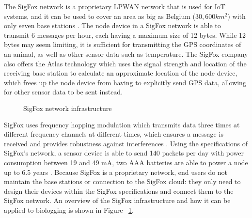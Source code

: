 \documentclass[sigplan,screen,nonacm]{acmart}
\begin{document}
The SigFox network is a proprietary LPWAN 
network that is used for IoT systems, and it can be used to cover an area as 
big as Belgium ($30,600 km^2$) with only seven base stations \cite{wild2023multi}. 
The node device in a SigFox network is able to transmit 6 messages per hour, 
each having a maximum size of 12 bytes. While 12 bytes may seem limiting, it is 
sufficient for transmitting the GPS coordinates of an animal, as well as other 
sensor data such as temperature\cite{wild2023multi}. The SigFox company also offers 
the Atlas technology which uses the signal strength and location of the receiving 
base station to calculate an approximate location of the node device, which frees up 
the node device from having to explicitly send GPS data, allowing for other sensor data 
to be sent instead\cite{wild2023multi}. 
\begin{figure}[htbp]
  \centering
  \caption{SigFox network infrastructure\cite{wild2023multi}}
  \label{fig:SigFox_infrastructure}
\end{figure}
SigFox uses frequency hopping modulation which transmits data three 
times at different frequency channels at different times, which ensures a message is received 
and provides robustness against interferences \cite{LavricSigfoxCommunication}. Using the specifications of SigFox's 
network, a sensor device is able to send 140 packets per day with power consumption  
between 19 and 49 mA, two AAA batteries are able to power a node up to 6.5 years
\cite{LavricSigfoxCommunication}. Because SigFox is a proprietary network, end users 
do not maintain the base stations or connection to the SigFox cloud: they only need to 
design their devices within the SigFox specifications and connect them to the SigFox network. 
An overview of the SigFox infrastructure and how it can be applied to biologging 
is shown in Figure ~\ref{fig:SigFox_infrastructure}.
\end{document}
